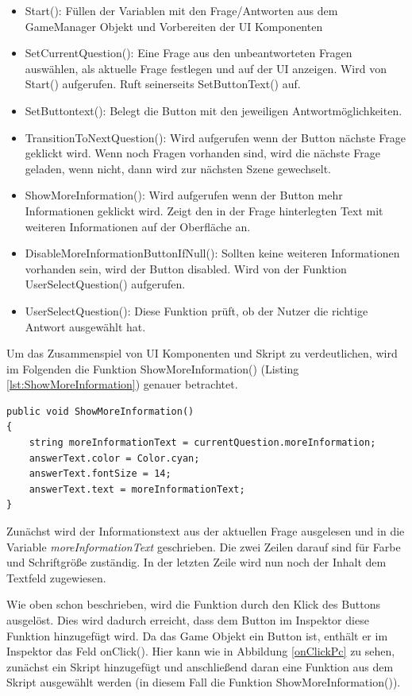 \begin{itemize}
\item Start(): Füllen der Variablen mit den Frage/Antworten aus dem GameManager Objekt und Vorbereiten der UI Komponenten
\item SetCurrentQuestion(): Eine Frage aus den unbeantworteten Fragen auswählen, als aktuelle Frage festlegen und auf der UI anzeigen. Wird von Start() aufgerufen. Ruft seinerseits SetButtonText() auf.
\item SetButtontext(): Belegt die Button mit den jeweiligen Antwortmöglichkeiten.
\item TransitionToNextQuestion(): Wird aufgerufen wenn der Button \glqq nächste Frage \grqq geklickt wird. Wenn noch Fragen vorhanden sind, wird die nächste Frage geladen, wenn nicht, dann wird zur nächsten Szene gewechselt.
\item ShowMoreInformation(): Wird aufgerufen wenn der Button \glqq mehr Informationen \grqq geklickt wird. Zeigt den in der Frage hinterlegten Text mit weiteren Informationen auf der Oberfläche an.
\item DisableMoreInformationButtonIfNull(): Sollten keine weiteren Informationen vorhanden sein, wird der Button disabled. Wird von der Funktion UserSelectQuestion() aufgerufen.
\item UserSelectQuestion(): Diese Funktion prüft, ob der Nutzer die richtige Antwort ausgewählt hat.
\end{itemize}

Um das Zusammenspiel von UI Komponenten und Skript zu verdeutlichen, wird im Folgenden die Funktion ShowMoreInformation() (Listing \ref{lst:ShowMoreInformation}) genauer betrachtet.

\lstset{style=sharpc}
\begin{lstlisting}[caption=Verwendung von UI Komponenten im Skript, label=lst:ShowMoreInformation]
public void ShowMoreInformation()
{
    string moreInformationText = currentQuestion.moreInformation;
    answerText.color = Color.cyan;
    answerText.fontSize = 14;      
    answerText.text = moreInformationText;
}
\end{lstlisting}

Zunächst wird der Informationstext aus der aktuellen Frage ausgelesen und in die Variable \textit{moreInformationText} geschrieben. Die zwei Zeilen darauf sind für Farbe und Schriftgröße zuständig. In der letzten Zeile wird nun noch der Inhalt dem Textfeld zugewiesen.

Wie oben schon beschrieben, wird die Funktion durch den Klick des Buttons ausgelöst. Dies wird dadurch erreicht, dass dem Button im Inspektor diese Funktion hinzugefügt wird. Da das Game Objekt ein Button ist, enthält er im Inspektor das Feld onClick(). Hier kann wie in Abbildung \ref{onClickPc} zu sehen, zunächst ein Skript hinzugefügt und anschließend daran eine Funktion aus dem Skript ausgewählt werden (in diesem Fall die Funktion ShowMoreInformation()).

